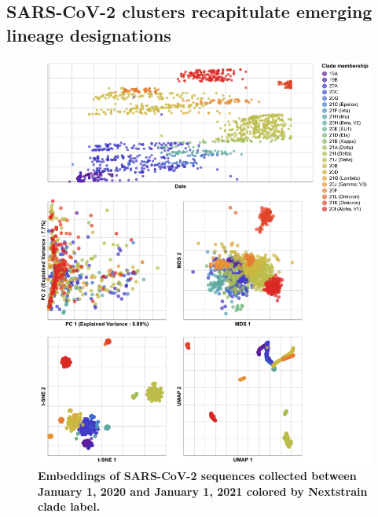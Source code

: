 \documentclass[10pt,letterpaper]{article}
\begin{document}
\subsection*{SARS-CoV-2 clusters recapitulate emerging lineage designations}

\begin{figure}[!h]
\includegraphics[width=\columnwidth]{figures/sarscov2-embeddings-by-Nextstrain_clade-clade.png}
\caption{{\bf Embeddings of SARS-CoV-2 sequences collected between January 1, 2020 and January 1, 2021 colored by Nextstrain clade label.}
}
\label{fig:sars-cov-2-2020-2021-embeddings}
\end{figure}
\end{document}

